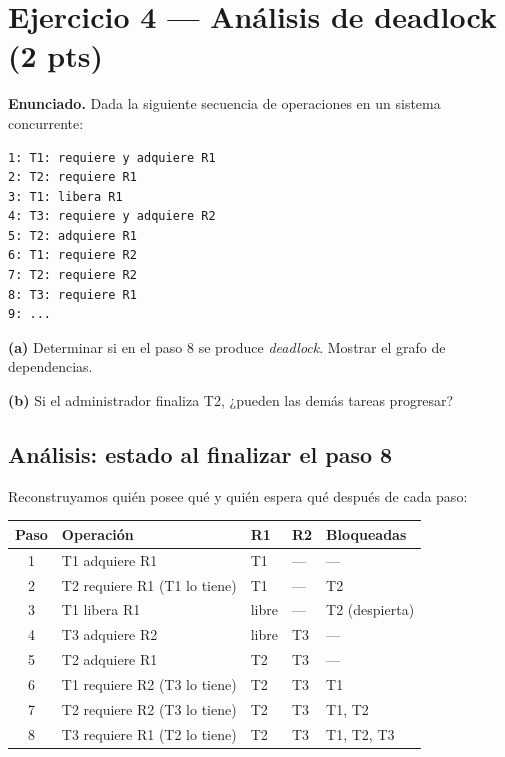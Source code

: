 \documentclass[11pt,a4paper]{article}
\begin{document}
\section{Ejercicio 4 --- Análisis de deadlock (2 pts)}

\textbf{Enunciado.} Dada la siguiente secuencia de operaciones en un
sistema concurrente:

\begin{lstlisting}[style=textstyle]
1: T1: requiere y adquiere R1
2: T2: requiere R1
3: T1: libera R1
4: T3: requiere y adquiere R2
5: T2: adquiere R1
6: T1: requiere R2
7: T2: requiere R2
8: T3: requiere R1
9: ...
\end{lstlisting}

\textbf{(a)} Determinar si en el paso 8 se produce \emph{deadlock}.
Mostrar el grafo de dependencias.

\textbf{(b)} Si el administrador finaliza T2, ¿pueden las demás tareas
progresar?

\subsection*{Análisis: estado al finalizar el paso 8}

Reconstruyamos quién posee qué y quién espera qué después de cada
paso:

\begin{center}
\small
\begin{tabular}{@{}cllll@{}}
\toprule
Paso & Operación & R1 & R2 & Bloqueadas \\
\midrule
1 & T1 adquiere R1                 & T1 & ---  & --- \\
2 & T2 requiere R1 (T1 lo tiene)   & T1 & ---  & T2 \\
3 & T1 libera R1                   & libre & --- & T2 (despierta) \\
4 & T3 adquiere R2                 & libre & T3 & --- \\
5 & T2 adquiere R1                 & T2 & T3 & --- \\
6 & T1 requiere R2 (T3 lo tiene)   & T2 & T3 & T1 \\
7 & T2 requiere R2 (T3 lo tiene)   & T2 & T3 & T1, T2 \\
8 & T3 requiere R1 (T2 lo tiene)   & T2 & T3 & T1, T2, T3 \\
\bottomrule
\end{tabular}
\end{center}
\end{document}
